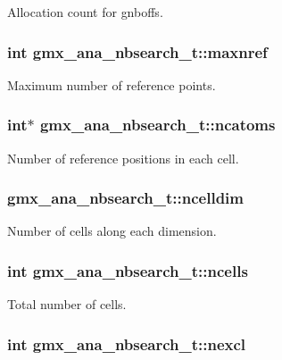 \-Allocation count for {\ttfamily gnboffs}. \hypertarget{structgmx__ana__nbsearch__t_ab43fa7489900d98596a597f71bd34c15}{
\subsubsection[{maxnref}]{\setlength{\rightskip}{0pt plus 5cm}int {\bf gmx\-\_\-ana\-\_\-nbsearch\-\_\-t\-::maxnref}}}\label{structgmx__ana__nbsearch__t_ab43fa7489900d98596a597f71bd34c15}
\-Maximum number of reference points. \hypertarget{structgmx__ana__nbsearch__t_a14a01f88e1afdd6e319f7ce79b383afb}{
\subsubsection[{ncatoms}]{\setlength{\rightskip}{0pt plus 5cm}int$\ast$ {\bf gmx\-\_\-ana\-\_\-nbsearch\-\_\-t\-::ncatoms}}}\label{structgmx__ana__nbsearch__t_a14a01f88e1afdd6e319f7ce79b383afb}
\-Number of reference positions in each cell. \hypertarget{structgmx__ana__nbsearch__t_a58cd68d34c0127e6bc4f590ee2280664}{
\subsubsection[{ncelldim}]{ {\bf gmx\-\_\-ana\-\_\-nbsearch\-\_\-t\-::ncelldim}}}\label{structgmx__ana__nbsearch__t_a58cd68d34c0127e6bc4f590ee2280664}
\-Number of cells along each dimension. \hypertarget{structgmx__ana__nbsearch__t_adef6c43d57ec204c2ac6a6dd7c67fbb9}{
\subsubsection[{ncells}]{\setlength{\rightskip}{0pt plus 5cm}int {\bf gmx\-\_\-ana\-\_\-nbsearch\-\_\-t\-::ncells}}}\label{structgmx__ana__nbsearch__t_adef6c43d57ec204c2ac6a6dd7c67fbb9}
\-Total number of cells. \hypertarget{structgmx__ana__nbsearch__t_a31344524458651286107135115ece807}{
\subsubsection[{nexcl}]{\setlength{\rightskip}{0pt plus 5cm}int {\bf gmx\-\_\-ana\-\_\-nbsearch\-\_\-t\-::nexcl}}}\label{structgmx__ana__nbsearch__t_a31344524458651286107135115ece807}
